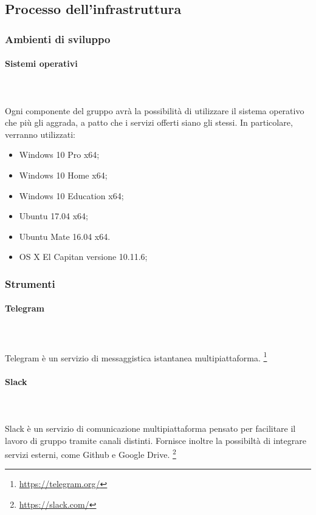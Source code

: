 \subparagraph{\color{red}{aggiungere diagramma uml???}}



\subsection{Processo dell'infrastruttura}

\subsubsection{Ambienti di sviluppo}
\paragraph{Sistemi operativi}
	~\\~\\Ogni componente del gruppo avrà la possibilità di utilizzare il sistema operativo che più gli aggrada, a patto che i servizi offerti siano gli stessi. In particolare, verranno utilizzati:
	\begin{itemize}
		\item Windows 10 Pro x64;
		\item Windows 10 Home x64;
		\item Windows 10 Education x64;
		\item Ubuntu 17.04 x64;
		\item Ubuntu Mate 16.04 x64.
		\item OS X El Capitan versione 10.11.6;
	\end{itemize}
	
\subsubsection{Strumenti}
\paragraph{Telegram} 
	~\\~\\ Telegram è un servizio di messaggistica istantanea multipiattaforma.
	\footnote{\href{https://telegram.org/}{https://telegram.org/}}
\paragraph{Slack}
	~\\~\\ Slack è un servizio di comunicazione multipiattaforma pensato per facilitare il lavoro di gruppo tramite canali distinti. Fornisce inoltre la possibiltà di integrare servizi esterni, come Github e Google Drive.
	\footnote{\href{https://slack.com/}{https://slack.com/}}

